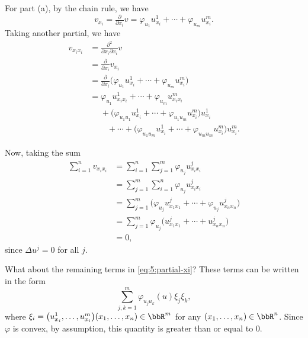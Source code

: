 \begin{solution}
  For part (a), by the chain rule, we have
  \[
    v_{x_i}=%
    \tfrac{\partial}{\partial x_i}v=%
    \varphi_{u_1}u^1_{x_i}+\dotsb+\varphi_{u_m}u^m_{x_i}.
  \]
  Taking another partial, we have
  \begin{equation}
    \label{eq:5:partial-xi}
    \begin{aligned}
      v_{x_ix_i}
      &=\tfrac{\partial^2}{\partial x_i\partial x_i} v\\
      &=\tfrac{\partial}{\partial x_i}v_{x_i}\\
      &=\tfrac{\partial}{\partial x_i}
      \bigl(\varphi_{u_1}u^1_{x_i}+\dotsb+\varphi_{u_m}u^m_{x_i}\bigr)\\
      &=\varphi_{u_1}u^1_{x_ix_i}+\dotsb+\varphi_{u_m}u_{x_ix_i}^m\\
      &\phantom{{}={}}+\bigl(\varphi_{u_1u_1}u_{x_i}^1
      +\dotsb+\varphi_{u_1u_m}u_{x_i}^m\bigr)u_{x_i}^1\\
      &\phantom{{}=+{}}+\dotsb+\bigl(\varphi_{u_1u_m}u_{x_i}^1
      +\dotsb+\varphi_{u_mu_m}u_{x_i}^m\bigr)u_{x_i}^m.
    \end{aligned}
  \end{equation}

  Now, taking the sum
  \begin{align*}
    \sum_{i=1}^nv_{x_ix_i}
    &=\sum_{i=1}^n\sum_{j=1}^m\varphi_{u_j}u^j_{x_ix_i}\\
    &=\sum_{j=1}^m\sum_{i=1}^n\varphi_{u_j}u^j_{x_ix_i}\\
    &=\sum_{j=1}^m\bigl(\varphi_{u_j}u^j_{x_1x_1}+\dotsb+\varphi_{u_j}u^j_{x_nx_n}\bigr)\\
    &=\sum_{j=1}^m\varphi_{u_j}\bigl(u^j_{x_1x_1}+\dotsb+u^j_{x_nx_n}\bigr)\\
    &=0,
  \end{align*}
  since \(\Delta u^j=0\) for all \(j\).

  What about the remaining terms in \eqref{eq:5:partial-xi}? These terms
  can be written in the form
  \[
    \sum_{j,k=1}^m\varphi_{u_ju_k}(u)\xi_j\xi_k,
  \]
  where
  \(\xi_i=\bigl(u^1_{x_i},\dotsc,u^m_{x_i}\bigr)(x_1,\dotsc,x_n)\in\bbR^m\)
  for any \((x_1,\dotsc,x_n)\in\bbR^n\). Since \(\varphi\) is convex, by
  assumption, this quantity is greater than or equal to \(0\).


\end{solution}
